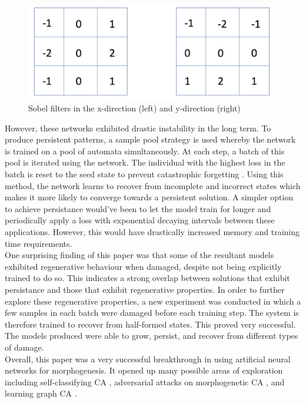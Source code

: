 \begin{figure}[!h]
    \centering
    \includegraphics[width=5in]{images/sobel.png}
    \caption{Sobel filters in the x-direction (left) and y-direction (right) \cite{sodha}}
    \label{fig:sobel}
\end{figure}

However, these networks exhibited drastic instability in the long term.
To produce persistent patterns, a sample pool strategy is used whereby the network is trained on a pool of automata simultaneously.
At each step, a batch of this pool is iterated using the network.
The individual with the highest loss in the batch is reset to the seed state to prevent catastrophic forgetting \cite{mccloskey1989catastrophic}. 
Using this method, the network learns to recover from incomplete and incorrect states which makes it more likely to converge towards a persistent solution.
A simpler option to achieve persistance would've been to let the model train for longer and periodically apply a loss with exponential decaying intervals between these applications.
However, this would have drastically increased memory and training time requirements.\\

One surprising finding of this paper was that some of the resultant models exhibited regenerative behaviour when damaged, despite not being explicitly trained to do so. 
This indicates a strong overlap between solutions that exhibit persistance and those that exhibit regenerative properties. 
In order to further explore these regenerative properties, a new experiment was conducted in which a few samples in each batch were damaged before each training step. 
The system is therefore trained to recover from half-formed states.
This proved very successful. The models produced were able to grow, persist, and recover from different types of damage.\\

Overall, this paper was a very successful breakthrough in using artificial neural networks for morphogenesis. It opened up many possible areas of exploration including self-classifying CA \cite{randazzo2020self-classifying}, adversarial attacks on morphogenetic CA \cite{randazzo2021adversarial}, and learning graph CA \cite{grattarola2021learning}.

